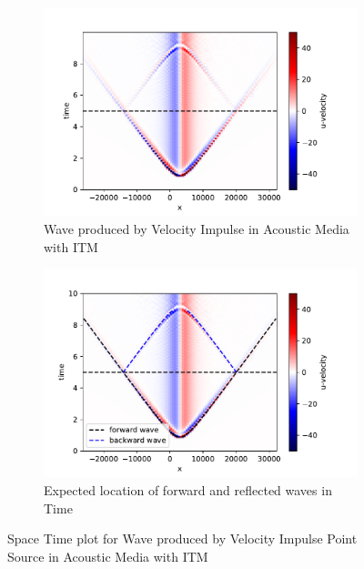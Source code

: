 \begin{figure}
\begin{subfigure}[b]{0.49\textwidth}   
    \centering 
    \includegraphics[width=\textwidth]{figures/AcousticITM.pdf}
    \caption{Wave produced by Velocity Impulse in Acoustic Media with \ac{ITM}}
\end{subfigure}
\hfill
\begin{subfigure}[b]{0.49\textwidth}   
    \centering 
    \includegraphics[width=\textwidth]{figures/AcousticITMAnnotated.pdf}
    \caption{Expected location of forward and reflected waves in Time}
    \label{subfig:acousticITMAnnotated}
\end{subfigure}
\caption{Space Time plot for Wave produced by Velocity Impulse Point Source in Acoustic Media with \ac{ITM}}
\label{fig:space-timeplot-acousticITM}
\end{figure}

